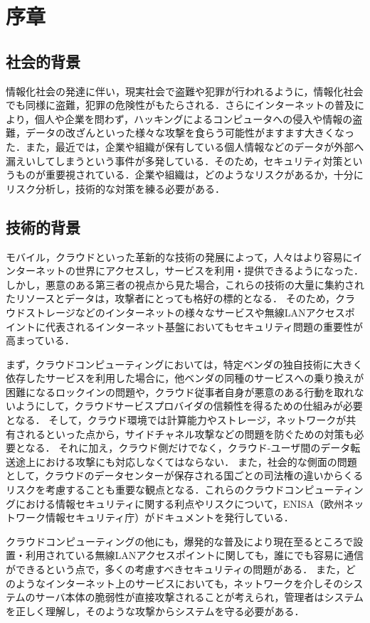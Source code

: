 \chapter{序章}

\section{社会的背景}
情報化社会の発達に伴い，現実社会で盗難や犯罪が行われるように，情報化社会でも同様に盗難，犯罪の危険性がもたらされる．さらにインターネットの普及により，個人や企業を問わず，ハッキングによるコンピュータへの侵入や情報の盗難，データの改ざんといった様々な攻撃を食らう可能性がますます大きくなった．また，最近では，企業や組織が保有している個人情報などのデータが外部へ漏えいしてしまうという事件が多発している．そのため，セキュリティ対策というものが重要視されている．企業や組織は，どのようなリスクがあるか，十分にリスク分析し，技術的な対策を練る必要がある．

\section{技術的背景}
モバイル，クラウドといった革新的な技術の発展によって，人々はより容易にインターネットの世界にアクセスし，サービスを利用・提供できるようになった．
しかし，悪意のある第三者の視点から見た場合，これらの技術の大量に集約されたリソースとデータは，攻撃者にとっても格好の標的となる．
そのため，クラウドストレージなどのインターネットの様々なサービスや無線LANアクセスポイントに代表されるインターネット基盤においてもセキュリティ問題の重要性が高まっている．

まず，クラウドコンピューティングにおいては，特定ベンダの独自技術に大きく依存したサービスを利用した場合に，他ベンダの同種のサービスへの乗り換えが困難になるロックインの問題や，クラウド従事者自身が悪意のある行動を取れないようにして，クラウドサービスプロバイダの信頼性を得るための仕組みが必要となる．
そして，クラウド環境では計算能力やストレージ，ネットワークが共有されるといった点から，サイドチャネル攻撃などの問題を防ぐための対策も必要となる．
それに加え，クラウド側だけでなく，クラウド-ユーザ間のデータ転送途上における攻撃にも対応しなくてはならない．
また，社会的な側面の問題として，クラウドのデータセンターが保存される国ごとの司法権の違いからくるリスクを考慮することも重要な観点となる．これらのクラウドコンピューティングにおける情報セキュリティに関する利点やリスクについて，ENISA（欧州ネットワーク情報セキュリティ庁）がドキュメント\cite{cloudrisk}を発行している．

クラウドコンピューティングの他にも，爆発的な普及により現在至るところで設置・利用されている無線LANアクセスポイントに関しても，誰にでも容易に通信ができるという点で，多くの考慮すべきセキュリティの問題がある．
また，どのようなインターネット上のサービスにおいても，ネットワークを介しそのシステムのサーバ本体の脆弱性が直接攻撃されることが考えられ，管理者はシステムを正しく理解し，そのような攻撃からシステムを守る必要がある．

